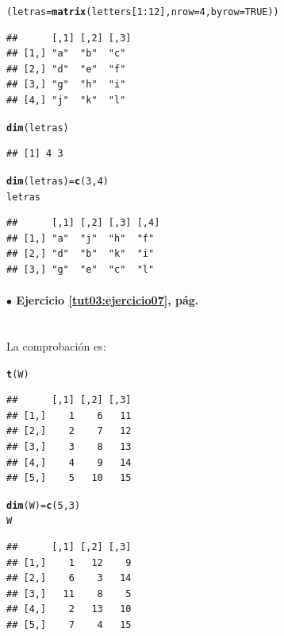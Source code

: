 \documentclass[10pt,a4paper]{article}\usepackage[]{graphicx}\usepackage[]{color}
\makeatletter
\newcommand{\hlnum}[1]{\textcolor[rgb]{0.686,0.059,0.569}{#1}}%
\newcommand{\hlopt}[1]{\textcolor[rgb]{0,0,0}{#1}}%
\newcommand{\hlstd}[1]{\textcolor[rgb]{0.345,0.345,0.345}{#1}}%
\newcommand{\hlkwb}[1]{\textcolor[rgb]{0.69,0.353,0.396}{#1}}%
\newcommand{\hlkwc}[1]{\textcolor[rgb]{0.333,0.667,0.333}{#1}}%
\newcommand{\hlkwd}[1]{\textcolor[rgb]{0.737,0.353,0.396}{\textbf{#1}}}%
\newenvironment{kframe}{%
 \def\at@end@of@kframe{}%
 \ifinner\ifhmode%
  \def\at@end@of@kframe{\end{minipage}}%
  \begin{minipage}{\columnwidth}%
 \fi\fi%
 \def\FrameCommand##1{\hskip\@totalleftmargin \hskip-\fboxsep
 \colorbox{shadecolor}{##1}\hskip-\fboxsep
     \hskip-\linewidth \hskip-\@totalleftmargin \hskip\columnwidth}%
 \MakeFramed {\advance\hsize-\width
   \@totalleftmargin\z@ \linewidth\hsize
   \@setminipage}}%
 {\par\unskip\endMakeFramed%
 \at@end@of@kframe}
\newenvironment{knitrout}{}{} %
\makeatother
\begin{document}
\begin{knitrout}
\color{fgcolor}\begin{kframe}
\begin{alltt}
\hlstd{(letras} \hlkwb{=} \hlkwd{matrix}\hlstd{(letters[}\hlnum{1}\hlopt{:}\hlnum{12}\hlstd{],} \hlkwc{nrow}\hlstd{=}\hlnum{4}\hlstd{,} \hlkwc{byrow}\hlstd{=}\hlnum{TRUE}\hlstd{))}
\end{alltt}
\begin{verbatim}
##      [,1] [,2] [,3]
## [1,] "a"  "b"  "c" 
## [2,] "d"  "e"  "f" 
## [3,] "g"  "h"  "i" 
## [4,] "j"  "k"  "l"
\end{verbatim}
\begin{alltt}
\hlkwd{dim}\hlstd{(letras)}
\end{alltt}
\begin{verbatim}
## [1] 4 3
\end{verbatim}
\begin{alltt}
\hlkwd{dim}\hlstd{(letras)}\hlkwb{=}\hlkwd{c}\hlstd{(}\hlnum{3}\hlstd{,}\hlnum{4}\hlstd{)}
\hlstd{letras}
\end{alltt}
\begin{verbatim}
##      [,1] [,2] [,3] [,4]
## [1,] "a"  "j"  "h"  "f" 
## [2,] "d"  "b"  "k"  "i" 
## [3,] "g"  "e"  "c"  "l"
\end{verbatim}
\end{kframe}
\end{knitrout}

\paragraph{\bf $\bullet$ Ejercicio \ref{tut03:ejercicio07}, pág. \pageref{tut03:ejercicio07}}
\label{tut03:ejercicio07:sol}\quad\\


La comprobación es:
\begin{knitrout}
\color{fgcolor}\begin{kframe}
\begin{alltt}
    \hlkwd{t}\hlstd{(W)}
\end{alltt}
\begin{verbatim}
##      [,1] [,2] [,3]
## [1,]    1    6   11
## [2,]    2    7   12
## [3,]    3    8   13
## [4,]    4    9   14
## [5,]    5   10   15
\end{verbatim}
\begin{alltt}
    \hlkwd{dim}\hlstd{(W)} \hlkwb{=} \hlkwd{c}\hlstd{(}\hlnum{5}\hlstd{,}\hlnum{3}\hlstd{)}
    \hlstd{W}
\end{alltt}
\begin{verbatim}
##      [,1] [,2] [,3]
## [1,]    1   12    9
## [2,]    6    3   14
## [3,]   11    8    5
## [4,]    2   13   10
## [5,]    7    4   15
\end{verbatim}
\end{kframe}
\end{knitrout}
\end{document}
